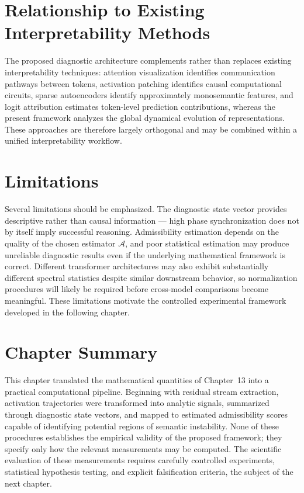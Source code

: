 \documentclass[11pt,twoside,openright]{book}
\numberwithin{equation}{chapter}
\theoremstyle{definition}
\theoremstyle{plain}
\theoremstyle{remark}
\theoremstyle{definition}
\begin{document}
\section{Relationship to Existing Interpretability Methods}

The proposed diagnostic architecture complements rather than replaces
existing interpretability techniques: attention visualization identifies
communication pathways between tokens, activation patching identifies
causal computational circuits, sparse autoencoders identify approximately
monosemantic features, and logit attribution estimates token-level
prediction contributions, whereas the present framework analyzes the
global dynamical evolution of representations. These approaches are
therefore largely orthogonal and may be combined within a unified
interpretability workflow.

\section{Limitations}

Several limitations should be emphasized. The diagnostic state vector
provides descriptive rather than causal information --- high phase
synchronization does not by itself imply successful reasoning.
Admissibility estimation depends on the quality of the chosen estimator
$\mathcal{A}$, and poor statistical estimation may produce unreliable
diagnostic results even if the underlying mathematical framework is
correct. Different transformer architectures may also exhibit
substantially different spectral statistics despite similar downstream
behavior, so normalization procedures will likely be required before
cross-model comparisons become meaningful. These limitations motivate the
controlled experimental framework developed in the following chapter.

\section{Chapter Summary}

This chapter translated the mathematical quantities of Chapter~13 into a
practical computational pipeline. Beginning with residual stream
extraction, activation trajectories were transformed into analytic
signals, summarized through diagnostic state vectors, and mapped to
estimated admissibility scores capable of identifying potential regions
of semantic instability. None of these procedures establishes the
empirical validity of the proposed framework; they specify only how the
relevant measurements may be computed. The scientific evaluation of these
measurements requires carefully controlled experiments, statistical
hypothesis testing, and explicit falsification criteria, the subject of
the next chapter.
\end{document}
